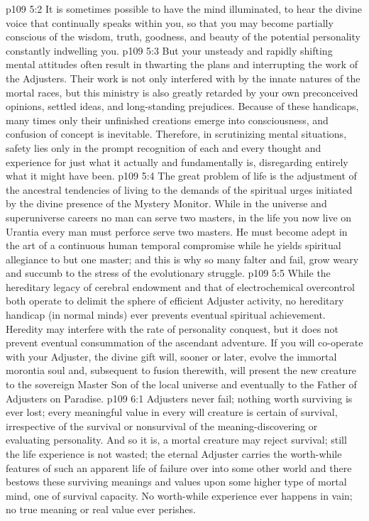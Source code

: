 \vs p109 5:2 It is sometimes possible to have the mind illuminated, to hear the divine voice that continually speaks within you, so that you may become partially conscious of the wisdom, truth, goodness, and beauty of the potential personality constantly indwelling you.
\vs p109 5:3 But your unsteady and rapidly shifting mental attitudes often result in thwarting the plans and interrupting the work of the Adjusters. Their work is not only interfered with by the innate natures of the mortal races, but this ministry is also greatly retarded by your own preconceived opinions, settled ideas, and long\hyp{}standing prejudices. Because of these handicaps, many times only their unfinished creations emerge into consciousness, and confusion of concept is inevitable. Therefore, in scrutinizing mental situations, safety lies only in the prompt recognition of each and every thought and experience for just what it actually and fundamentally is, disregarding entirely what it might have been.\plusone
\pc \vs p109 5:4 The great problem of life is the adjustment of the ancestral tendencies of living to the demands of the spiritual urges initiated by the divine presence of the Mystery Monitor. While in the universe and superuniverse careers no man can serve two masters, in the life you now live on Urantia every man must perforce serve two masters. He must become adept in the art of a continuous human temporal compromise while he yields spiritual allegiance to but one master; and this is why so many falter and fail, grow weary and succumb to the stress of the evolutionary struggle.
\vs p109 5:5 While the hereditary legacy of cerebral endowment and that of electrochemical overcontrol both operate to delimit the sphere of efficient Adjuster activity, no hereditary handicap (in normal minds) ever prevents eventual spiritual achievement. Heredity may interfere with the rate of personality conquest, but it does not prevent eventual consummation of the ascendant adventure. If you will co\hyp{}operate with your Adjuster, the divine gift will, sooner or later, evolve the immortal morontia soul and, subsequent to fusion therewith, will present the new creature to the sovereign Master Son of the local universe and eventually to the Father of Adjusters on Paradise.
\vs p109 6:1 Adjusters never fail; nothing worth surviving is ever lost; every meaningful value in every will creature is certain of survival, irrespective of the survival or nonsurvival of the meaning\hyp{}discovering or evaluating personality. And so it is, a mortal creature may reject survival; still the life experience is not wasted; the eternal Adjuster carries the worth\hyp{}while features of such an apparent life of failure over into some other world and there bestows these surviving meanings and values upon some higher type of mortal mind, one of survival capacity. No worth\hyp{}while experience ever happens in vain; no true meaning or real value ever perishes.

